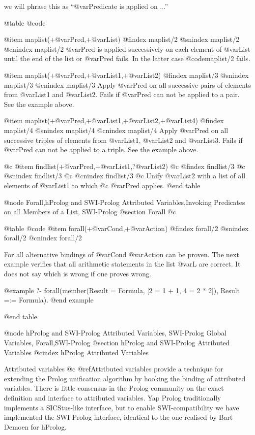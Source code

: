 we will phrase this as ``@var{Predicate} is applied on ...''

@table @code

@item maplist(+@var{Pred},+@var{List})
@findex maplist/2
@snindex maplist/2
@cnindex maplist/2
@var{Pred} is applied successively on each element of @var{List} until
the end of the list or @var{Pred} fails. In the latter case 
@code{maplist/2} fails.

@item maplist(+@var{Pred},+@var{List1},+@var{List2})
@findex maplist/3
@snindex maplist/3
@cnindex maplist/3
Apply @var{Pred} on all successive pairs of elements from
@var{List1} and
@var{List2}. Fails if @var{Pred} can not be applied to a
pair. See the example above.

@item maplist(+@var{Pred},+@var{List1},+@var{List2},+@var{List4})
@findex maplist/4
@snindex maplist/4
@cnindex maplist/4
Apply @var{Pred} on all successive triples of elements from @var{List1},
@var{List2} and @var{List3}. Fails if @var{Pred} can not be applied to a
triple. See the example above.

@c @item findlist(+@var{Pred},+@var{List1},?@var{List2})
@c @findex findlist/3
@c @snindex findlist/3
@c @cnindex findlist/3
@c Unify @var{List2} with a list of all elements of @var{List1} to which
@c @var{Pred} applies.
@end table

@node Forall,hProlog and SWI-Prolog Attributed Variables,Invoking Predicates on all Members of a List, SWI-Prolog
@section Forall			
@c \label{sec:forall2}

@table @code
@item forall(+@var{Cond},+@var{Action})
@findex forall/2
@snindex forall/2
@cnindex forall/2

For all alternative bindings of @var{Cond} @var{Action} can be proven.
The next example verifies that all arithmetic statements in the list
@var{L} are correct. It does not say which is wrong if one proves wrong.

@example
?- forall(member(Result = Formula, [2 = 1 + 1, 4 = 2 * 2]),
                 Result =:= Formula).
@end example

@end table

@node hProlog and SWI-Prolog Attributed Variables, SWI-Prolog Global Variables, Forall,SWI-Prolog
@section hProlog and SWI-Prolog Attributed Variables
@cindex hProlog Attributed Variables

Attributed variables
@c @ref{Attributed variables}
provide a technique for extending the
Prolog unification algorithm by hooking the binding of attributed
variables. There is little consensus in the Prolog community on the
exact definition and interface to attributed variables.  Yap Prolog
traditionally implements a SICStus-like interface, but to enable
SWI-compatibility we have implemented the SWI-Prolog interface,
identical to the one realised by Bart Demoen for hProlog.

